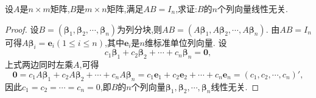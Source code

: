 \documentclass[../../main.tex]{subfiles}%
\begin{document}
\begin{proposition}\label{proposition:线性无关向量组的命题4}
设\(A\)是\(n\times m\)矩阵,\(B\)是\(m\times n\)矩阵,满足\(AB = I_n\),求证:\(B\)的\(n\)个列向量线性无关.
\end{proposition}
\begin{proof}

设\(B = (\boldsymbol{\beta}_1,\boldsymbol{\beta}_2,\cdots,\boldsymbol{\beta}_n)\)为列分块,则\(AB=(A\boldsymbol{\beta}_1,A\boldsymbol{\beta}_2,\cdots,A\boldsymbol{\beta}_n)\). 由\(AB = I_n\)可得\(A\boldsymbol{\beta}_i=\boldsymbol{e}_i(1\leqslant  i\leqslant  n)\),其中\(\boldsymbol{e}_i\)是\(n\)维标准单位列向量. 设
\[
c_1\boldsymbol{\beta}_1 + c_2\boldsymbol{\beta}_2+\cdots + c_n\boldsymbol{\beta}_n=\boldsymbol{0},
\]
上式两边同时左乘\(A\),可得
\[
\boldsymbol{0}=c_1A\boldsymbol{\beta}_1 + c_2A\boldsymbol{\beta}_2+\cdots + c_nA\boldsymbol{\beta}_n=c_1\boldsymbol{e}_1 + c_2\boldsymbol{e}_2+\cdots + c_n\boldsymbol{e}_n=(c_1,c_2,\cdots,c_n)',
\]
因此\(c_1 = c_2=\cdots = c_n = 0\),即\(B\)的\(n\)个列向量\(\boldsymbol{\beta}_1,\boldsymbol{\beta}_2,\cdots,\boldsymbol{\beta}_n\)线性无关.

\end{proof}
\end{document}
